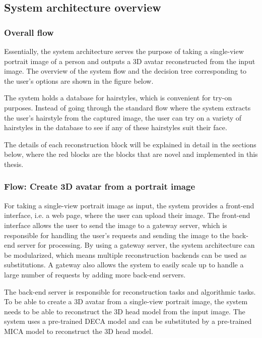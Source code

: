\subsection{System architecture overview}

\subsubsection{Overall flow}

Essentially, the system architecture serves the purpose of taking a single-view portrait image of a person and outputs a 3D avatar reconstructed from the input image. The overview of the system flow and the decision tree corresponding to the user's options are shown in the figure below.


The system holds a database for hairstyles, which is convenient for try-on purposes. Instead of going through the standard flow where the system extracts the user's hairstyle from the captured image, the user can try on a variety of hairstyles in the database to see if any of these hairstyles suit their face.

The details of each reconstruction block will be explained in detail in the sections below, where the red blocks are the blocks that are novel and implemented in this thesis.

\subsubsection{Flow: Create 3D avatar from a portrait image}
For taking a single-view portrait image as input, the system provides a front-end interface, i.e. a web page, where the user can upload their image. The front-end interface allows the user to send the image to a gateway server, which is responsible for handling the user's requests and sending the image to the back-end server for processing. By using a gateway server, the system architecture can be modularized, which means multiple reconstruction backends can be used as substitutions. A gateway also allows the system to easily scale up to handle a large number of requests by adding more back-end servers.

The back-end server is responsible for reconstruction tasks and algorithmic tasks. To be able to create a 3D avatar from a single-view portrait image, the system needs to be able to reconstruct the 3D head model from the input image. The system uses a pre-trained DECA model and can be substituted by a pre-trained MICA model \cite{fengLearningAnimatableDetailed2021} to reconstruct the 3D head model.


